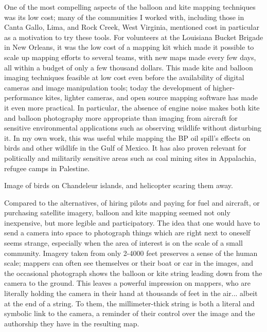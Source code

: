 \documentclass[11pt,oneside,notitlepage]{report}
\begin{document}
One of the most compelling aspects of the balloon and kite mapping techniques was its low cost; many of the communities I worked with, including those in Canta Gallo, Lima, and Rock Creek, West Virginia, mentioned cost in particular as a motivation to try these tools. For volunteers at the Louisiana Bucket Brigade in New Orleans, it was the low cost of a mapping kit which made it possible to scale up mapping efforts to several teams, with new maps made every few days, all within a budget of only a few thousand dollars. This made kite and balloon imaging techniques feasible at low cost even before the availability of digital cameras and image manipulation tools; today the development of higher-performance kites, lighter cameras, and open source mapping software has made it even more practical. In particular, the absence of engine noise makes both kite and balloon photography more appropriate than imaging from aircraft for sensitive environmental applications such as observing wildlife without disturbing it. \cite{aber1999kite} In my own work, this was useful while mapping the BP oil spill's effects on birds and other wildlife in the Gulf of Mexico. It has also proven relevant for politically and militarily sensitive areas such as coal mining sites in Appalachia, refugee camps in Palestine.

Image of birds on Chandeleur islands, and helicopter scaring them away.  

Compared to the alternatives, of hiring pilots and paying for fuel and aircraft, or purchasing satellite imagery, balloon and kite mapping seemed not only inexpensive, but more legible and participatory. The idea that one would have to send a camera into space to photograph things which are right next to oneself seems strange, especially when the area of interest is on the scale of a small community. Imagery taken from only 2-4000 feet preserves a sense of the human scale; mappers can often see themselves or their boat or car in the images, and the occasional photograph shows the balloon or kite string leading down from the camera to the ground. This leaves a powerful impression on mappers, who are literally holding the camera in their hand at thousands of feet in the air... albeit at the end of a string. To them, the millimeter-thick string is both a literal and symbolic link to the camera, a reminder of their control over the image and the authorship they have in the resulting map.  
\end{document}
